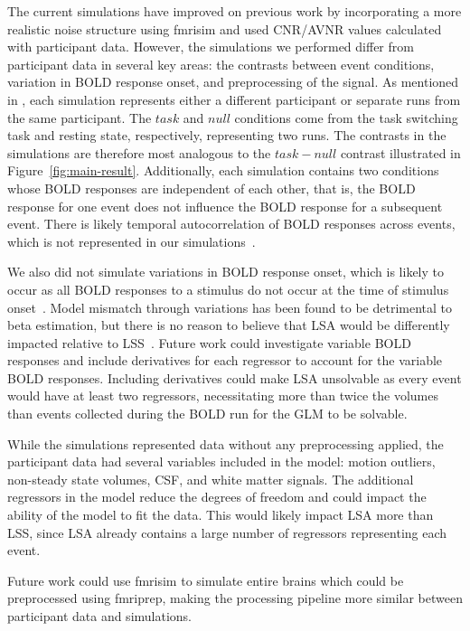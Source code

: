 \documentclass[phd,figures,tables,ackpage,abstractpage,publicabstractpage]{uithesis}
\begin{document}
The current simulations have improved on previous work by incorporating a more
realistic noise structure using fmrisim and used CNR/AVNR values calculated with participant data.
However, the simulations we performed differ from participant data in several key areas:
the contrasts between event conditions,
variation in BOLD response onset, and preprocessing of the signal.
As mentioned in , each simulation represents
either a different participant or separate runs from the same participant.
The $task$ and $null$ conditions come from the task switching task and resting state,
respectively, representing two runs.
The contrasts in the simulations are therefore most analogous to the $task - null$
contrast illustrated in Figure~\ref{fig:main-result}.
Additionally, each simulation contains two conditions whose BOLD responses
are independent of each other, that is, the BOLD response for one event
does not influence the BOLD response for a subsequent event.
There is likely temporal autocorrelation of BOLD responses across events,
which is not represented in our simulations~\cite{Abdulrahman2016}.

We also did not simulate variations in BOLD response onset, which is likely to occur
as all BOLD responses to a stimulus do not occur at the time of stimulus onset~\cite{DEsposito2003}.
Model mismatch through variations has been found to be detrimental to beta estimation, 
but there is no reason to believe that LSA would be differently impacted relative to LSS~\cite{Turner2012a}.
Future work could investigate variable BOLD responses and include derivatives for each regressor to account for
the variable BOLD responses.
Including derivatives could make LSA unsolvable as every event would have at least two regressors, necessitating
more than twice the volumes than events collected during the BOLD run
for the GLM to be solvable.

While the simulations represented data without any preprocessing applied,
the participant data had several variables included in the model: motion outliers, non-steady state volumes,
CSF, and white matter signals.
The additional regressors in the model reduce the degrees of freedom
and could impact the ability of the model to fit the data.
This would likely impact LSA more than LSS, since LSA already contains
a large number of regressors representing each event.

Future work could use fmrisim to simulate entire brains which could be preprocessed using fmriprep,
making the processing pipeline more similar between participant data and simulations.
\end{document}
